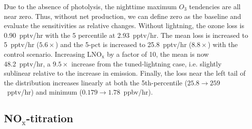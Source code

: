 Due to the absence of photolysis, the nighttime maximum $O_3$ tendencies are all
near zero. Thus, without net production, we can define zero as the baseline and evaluate
the sensitivities as relative changes. Without lightning, the ozone loss is 0.90~pptv/hr
with the 5 percentile at 2.93~pptv/hr. The mean loss is increased to 5~pptv/hr
($5.6\times$) and the 5-pct is increased to 25.8~pptv/hr ($8.8\times$) with
the control scenario. Increasing LNO$_\mathrm{x}$ by a factor of 10, the mean
is now 48.2~pptv/hr, a $9.5\times$ increase from the tuned-lightning case, i.e.
slightly sublinear relative to the increase in emission. Finally, the loss near the
left tail of the distribution increases linearly at both the 5th-percentile
($25.8\rightarrow259$~pptv/hr) and minimum ($0.179\rightarrow1.78$~ppbv/hr).

\subsection{NO$_\mathrm{x}$-titration}

